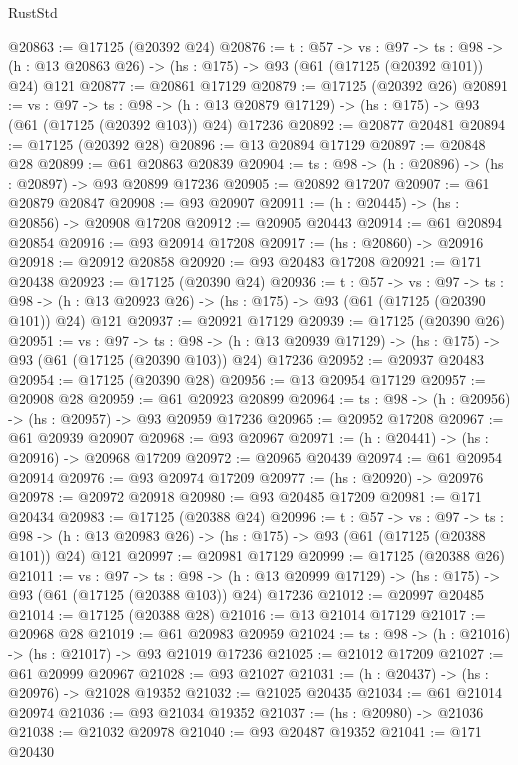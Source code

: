 \begin{lexlean}{RustStd}
\begin{coremodule}
@20863 := @17125 (@20392 @24)
@20876 := {t : @57} ->
  {vs : @97} ->
  {ts : @98} -> (h : @13 @20863 @26) -> (hs : @175) -> @93 (@61 (@17125 (@20392 @101)) @24) @121
@20877 := @20861 @17129
@20879 := @17125 (@20392 @26)
@20891 := {vs : @97} ->
  {ts : @98} ->
  (h : @13 @20879 @17129) -> (hs : @175) -> @93 (@61 (@17125 (@20392 @103)) @24) @17236
@20892 := @20877 @20481
@20894 := @17125 (@20392 @28)
@20896 := @13 @20894 @17129
@20897 := @20848 @28
@20899 := @61 @20863 @20839
@20904 := {ts : @98} -> (h : @20896) -> (hs : @20897) -> @93 @20899 @17236
@20905 := @20892 @17207
@20907 := @61 @20879 @20847
@20908 := @93 @20907
@20911 := (h : @20445) -> (hs : @20856) -> @20908 @17208
@20912 := @20905 @20443
@20914 := @61 @20894 @20854
@20916 := @93 @20914 @17208
@20917 := (hs : @20860) -> @20916
@20918 := @20912 @20858
@20920 := @93 @20483 @17208
@20921 := @171 @20438
@20923 := @17125 (@20390 @24)
@20936 := {t : @57} ->
  {vs : @97} ->
  {ts : @98} -> (h : @13 @20923 @26) -> (hs : @175) -> @93 (@61 (@17125 (@20390 @101)) @24) @121
@20937 := @20921 @17129
@20939 := @17125 (@20390 @26)
@20951 := {vs : @97} ->
  {ts : @98} ->
  (h : @13 @20939 @17129) -> (hs : @175) -> @93 (@61 (@17125 (@20390 @103)) @24) @17236
@20952 := @20937 @20483
@20954 := @17125 (@20390 @28)
@20956 := @13 @20954 @17129
@20957 := @20908 @28
@20959 := @61 @20923 @20899
@20964 := {ts : @98} -> (h : @20956) -> (hs : @20957) -> @93 @20959 @17236
@20965 := @20952 @17208
@20967 := @61 @20939 @20907
@20968 := @93 @20967
@20971 := (h : @20441) -> (hs : @20916) -> @20968 @17209
@20972 := @20965 @20439
@20974 := @61 @20954 @20914
@20976 := @93 @20974 @17209
@20977 := (hs : @20920) -> @20976
@20978 := @20972 @20918
@20980 := @93 @20485 @17209
@20981 := @171 @20434
@20983 := @17125 (@20388 @24)
@20996 := {t : @57} ->
  {vs : @97} ->
  {ts : @98} -> (h : @13 @20983 @26) -> (hs : @175) -> @93 (@61 (@17125 (@20388 @101)) @24) @121
@20997 := @20981 @17129
@20999 := @17125 (@20388 @26)
@21011 := {vs : @97} ->
  {ts : @98} ->
  (h : @13 @20999 @17129) -> (hs : @175) -> @93 (@61 (@17125 (@20388 @103)) @24) @17236
@21012 := @20997 @20485
@21014 := @17125 (@20388 @28)
@21016 := @13 @21014 @17129
@21017 := @20968 @28
@21019 := @61 @20983 @20959
@21024 := {ts : @98} -> (h : @21016) -> (hs : @21017) -> @93 @21019 @17236
@21025 := @21012 @17209
@21027 := @61 @20999 @20967
@21028 := @93 @21027
@21031 := (h : @20437) -> (hs : @20976) -> @21028 @19352
@21032 := @21025 @20435
@21034 := @61 @21014 @20974
@21036 := @93 @21034 @19352
@21037 := (hs : @20980) -> @21036
@21038 := @21032 @20978
@21040 := @93 @20487 @19352
@21041 := @171 @20430

\end{coremodule}
\end{lexlean}
